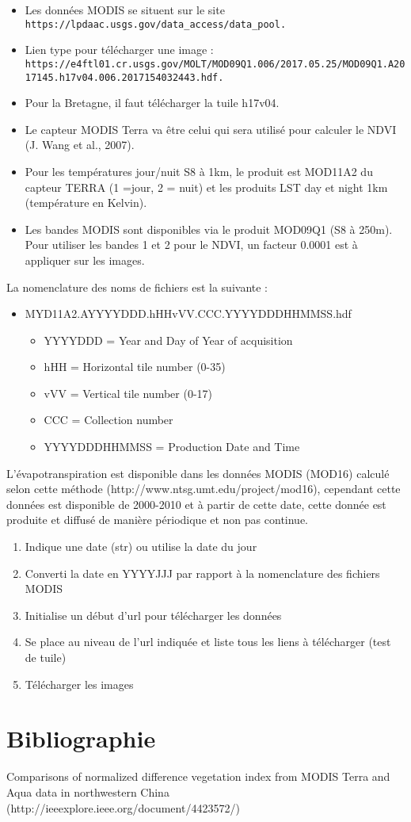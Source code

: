 \documentclass[10pt,a4paper]{article}
\begin{document}
\begin{itemize}
\item Les données MODIS se situent sur le site \verb!https://lpdaac.usgs.gov/data_access/data_pool.!
\item Lien type pour télécharger une image : \verb!https://e4ftl01.cr.usgs.gov/MOLT/MOD09Q1.006/2017.05.25/MOD09Q1.A2017145.h17v04.006.2017154032443.hdf.!
\item Pour la Bretagne, il faut télécharger la tuile h17v04. 
\item Le capteur MODIS Terra va être celui qui sera utilisé pour calculer le NDVI (J. Wang et al., 2007).
\item Pour les températures jour/nuit S8 à 1km, le produit est MOD11A2 du capteur TERRA (1 =jour, 2 = nuit) et les produits LST day et night 1km (température en Kelvin).
\item Les bandes MODIS sont disponibles via le produit MOD09Q1 (S8 à 250m). Pour utiliser les bandes 1 et 2 pour le NDVI, un facteur 0.0001 est à appliquer sur les images.
\end{itemize}  

La nomenclature des noms de fichiers est la suivante :
\begin{itemize}
\item MYD11A2.AYYYYDDD.hHHvVV.CCC.YYYYDDDHHMMSS.hdf
\begin{itemize}
\item YYYYDDD = Year and Day of Year of acquisition
\item hHH = Horizontal tile number (0-35)
\item vVV = Vertical tile number (0-17)
\item CCC = Collection number
\item YYYYDDDHHMMSS = Production Date and Time
\end{itemize}
\end{itemize}

L'évapotranspiration est disponible dans les données MODIS (MOD16) calculé selon cette méthode (http://www.ntsg.umt.edu/project/mod16), cependant cette données est disponible de 2000-2010 et à partir de cette date, cette donnée est produite et diffusé de manière périodique et non pas continue.

\begin{enumerate}
\item Indique une date (str) ou utilise la date du jour
\item Converti la date en YYYYJJJ par rapport à la nomenclature des fichiers MODIS
\item Initialise un début d'url pour télécharger les données
\item Se place au niveau de l'url indiquée et liste tous les liens à télécharger (test de tuile)
\item Télécharger les images
\end{enumerate}

\section{Bibliographie}

Comparisons of normalized difference vegetation index from MODIS Terra and Aqua data in northwestern China (http://ieeexplore.ieee.org/document/4423572/)
\end{document}
